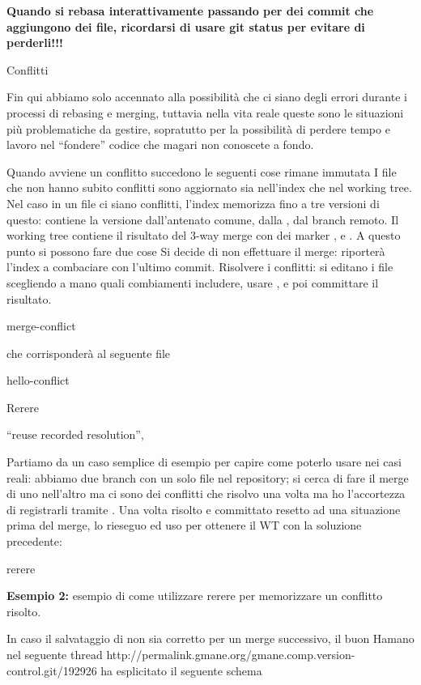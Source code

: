 {\bf Quando si rebasa interattivamente passando per dei commit che
aggiungono dei file, ricordarsi di usare git status per evitare di perderli!!!}

\sezione Conflitti

Fin qui abbiamo solo accennato alla possibilit\`a che ci siano degli errori
durante i processi di rebasing e merging, tuttavia nella vita reale queste sono
le situazioni pi\`u problematiche da gestire, sopratutto per la possibilit\`a di
perdere tempo e lavoro nel ``fondere'' codice che magari non conoscete a fondo.

Quando avviene un conflitto succedono le seguenti cose
\iniziaelenco
\li\HEAD rimane immutata
\li I file che non hanno subito conflitti sono aggiornato sia nell'index che nel
working tree.
\li Nel caso in un file ci siano conflitti, l'index memorizza fino a tre
versioni di questo:  contiene la versione dall'antenato comune,
 dalla \HEAD,  dal branch remoto. Il working tree
contiene il risultato del 3-way merge con dei marker \code{<<<<}, \code{===} e
\code{>>>>}.
\fineelenco
A questo punto si possono fare due cose
\iniziaelenco
\li Si decide di non effettuare il merge: 
riporter\`a l'index a combaciare con l'ultimo commit.
\li Risolvere i conflitti: si editano i file scegliendo a mano quali combiamenti
includere, usare , e poi committare il risultato.
\fineelenco

 merge-conflict

che corrisponder\`a al seguente file

 hello-conflict

\sezione Rerere

``reuse recorded resolution'', 

Partiamo da un caso semplice di esempio per capire come poterlo usare nei casi
reali: abbiamo due branch con un solo file nel repository; si cerca di fare
il merge di uno nell'altro ma ci sono dei conflitti che risolvo una volta ma
ho l'accortezza di registrarli tramite . Una volta risolto e
committato resetto ad una situazione prima del merge, lo rieseguo ed uso
 per ottenere il WT con la soluzione precedente:

\lonelypage rerere

{\bf Esempio 2:} esempio di come utilizzare rerere per memorizzare un conflitto
risolto.

In caso il salvataggio di  non sia corretto per un merge
successivo, il buon Hamano nel seguente thread http://permalink.gmane.org/gmane.comp.version-control.git/192926
ha esplicitato il seguente schema

